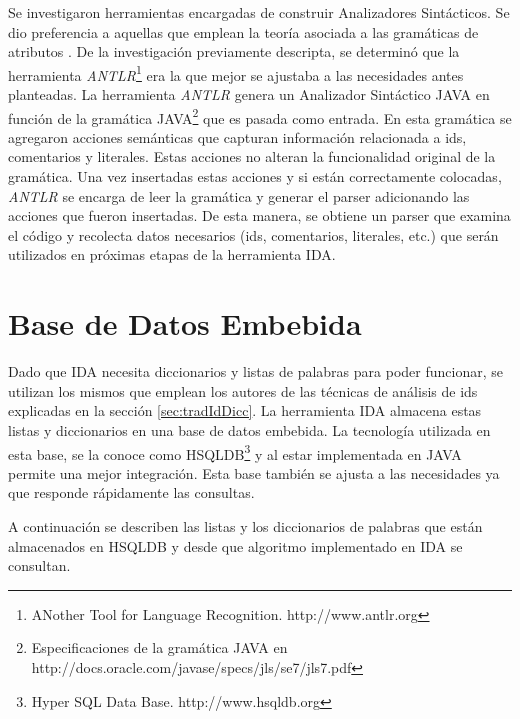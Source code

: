 \documentclass[a4paper,12pt]{report}
\begin{document}
Se investigaron herramientas encargadas de construir Analizadores Sintácticos. Se dio preferencia a aquellas que emplean la teoría asociada a las gramáticas de atributos \cite{AHUL06}. De la investigación previamente descripta, se determinó que la herramienta \textit{ANTLR}\footnote[1]{ANother Tool for Language Recognition. http://www.antlr.org} era la que mejor se ajustaba a las necesidades antes planteadas. La herramienta \textit{ANTLR} genera un Analizador Sintáctico JAVA en función de la gramática JAVA\footnote[2]{Especificaciones de la gramática JAVA en http://docs.oracle.com/javase/specs/jls/se7/jls7.pdf} que es pasada como entrada. 
En esta gramática se agregaron acciones semánticas que capturan información relacionada a ids, comentarios y literales. Estas acciones no alteran la funcionalidad original de la gramática. Una vez insertadas estas acciones y si están correctamente colocadas, \textit{ANTLR} se encarga de leer la gramática y generar el parser adicionando las acciones que fueron insertadas. De esta manera, se obtiene un parser que examina el código y recolecta datos necesarios (ids, comentarios, literales, etc.) que serán utilizados en próximas etapas de la herramienta IDA. 

\section{Base de Datos  Embebida}
\label{sec:bseEmb}

Dado que IDA necesita diccionarios y listas de palabras para poder funcionar, se utilizan los mismos que emplean los autores de las técnicas de análisis de ids explicadas en la sección \ref{sec:tradIdDicc}. La herramienta IDA almacena estas listas y diccionarios en una base de datos embebida. La tecnología utilizada en esta base, se la conoce como HSQLDB\footnote[3]{Hyper SQL Data Base. http://www.hsqldb.org} y al estar implementada en JAVA permite una mejor integración. Esta base también se ajusta a las necesidades ya que responde rápidamente las consultas.

A continuación se describen las listas y los diccionarios de palabras que están almacenados en HSQLDB y desde que algoritmo implementado en IDA se consultan.
\end{document}
